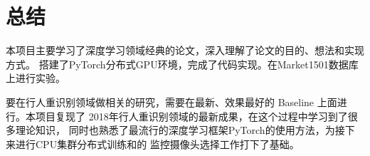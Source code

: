\section{总结}
本项目主要学习了深度学习领域经典的论文，深入理解了论文\cite{sun2017beyond}的目的、想法和实现方式。
搭建了PyTorch分布式GPU环境，完成了代码实现。在Market1501数据库上进行实验。

要在行人重识别领域做相关的研究，需要在最新、效果最好的 Baseline 上面进行。本项目复现了
2018年行人重识别领域的最新成果\cite{sun2017beyond}，在这个过程中学习到了很多理论知识，
同时也熟悉了最流行的深度学习框架PyTorch的使用方法，为接下来进行CPU集群分布式训练和的
监控摄像头选择工作打下了基础。\cite{chen2018person}\cite{sermanet2013overfeat}
\cite{girshick2015fast}\cite{zheng2015scalable}
